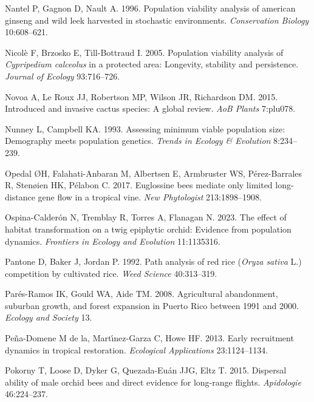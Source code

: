 \documentclass[
  12pt,
  letterpaper,
]{book}
\newlength{\cslhangindent}
\newenvironment{CSLReferences}[2] %
 {\begin{list}{}{%
  \setlength{\itemindent}{0pt}
  \setlength{\leftmargin}{0pt}
  \setlength{\parsep}{0pt}
  \ifodd #1
   \setlength{\leftmargin}{\cslhangindent}
   \setlength{\itemindent}{-1\cslhangindent}
  \fi
  \setlength{\itemsep}{#2\baselineskip}}}
 {\end{list}}
\begin{document}
\begin{CSLReferences}{1}{0}
Nantel P, Gagnon D, Nault A. 1996. Population viability analysis of
american ginseng and wild leek harvested in stochastic environments.
\emph{Conservation Biology} 10:608--621.

Nicolè F, Brzosko E, Till-Bottraud I. 2005. Population viability
analysis of \emph{{C}ypripedium {c}alceolus} in a protected area:
Longevity, stability and persistence. \emph{Journal of Ecology}
93:716--726.

Novoa A, Le Roux JJ, Robertson MP, Wilson JR, Richardson DM. 2015.
Introduced and invasive cactus species: A global review. \emph{AoB
Plants} 7:plu078.

Nunney L, Campbell KA. 1993. Assessing minimum viable population size:
Demography meets population genetics. \emph{Trends in {E}cology \&
{E}volution} 8:234--239.

Opedal ØH, Falahati-Anbaran M, Albertsen E, Armbruster WS,
Pérez-Barrales R, Stenøien HK, Pélabon C. 2017. Euglossine bees mediate
only limited long-distance gene flow in a tropical vine. \emph{New
Phytologist} 213:1898--1908.

Ospina-Calderón N, Tremblay R, Torres A, Flanagan N. 2023. The effect of
habitat transformation on a twig epiphytic orchid: Evidence from
population dynamics. \emph{Frontiers in Ecology and Evolution}
11:1135316.

Pantone D, Baker J, Jordan P. 1992. Path analysis of red rice
(\emph{{O}ryza sativa} {L}.) competition by cultivated rice. \emph{Weed
Science} 40:313--319.

Parés-Ramos IK, Gould WA, Aide TM. 2008. Agricultural abandonment,
suburban growth, and forest expansion in {P}uerto {R}ico between 1991
and 2000. \emph{Ecology and Society} 13.

Peña-Domene M de la, Martı́nez-Garza C, Howe HF. 2013. Early recruitment
dynamics in tropical restoration. \emph{Ecological Applications}
23:1124--1134.

Pokorny T, Loose D, Dyker G, Quezada-Euán JJG, Eltz T. 2015. Dispersal
ability of male orchid bees and direct evidence for long-range flights.
\emph{Apidologie} 46:224--237.


\end{CSLReferences}
\end{document}
